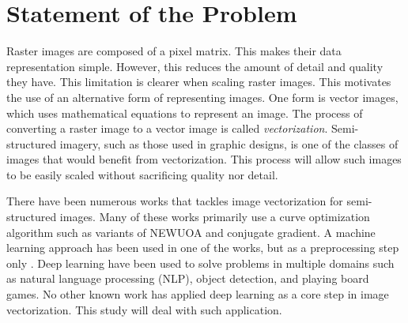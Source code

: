 \chapter{Statement of the Problem} 
\label{sec:ResearchQ}

Raster images are composed of a pixel matrix. This makes their data representation simple. However, this reduces the amount of detail and quality they have. This limitation is clearer when scaling raster images. This motivates the use of an alternative form of representing images. One form is vector images, which uses mathematical equations to represent an image. The process of converting a raster image to a vector image is called \textit{vectorization}. Semi-structured imagery, such as those used in graphic designs, is one of the classes of images that would benefit from vectorization. This process will allow such images to be easily scaled without sacrificing quality nor detail.

There have been numerous works that tackles image vectorization for semi-structured images. Many of these works primarily use a curve optimization algorithm such as variants of NEWUOA and conjugate gradient. A machine learning approach has been used in one of the works, but as a preprocessing step only \cite{hoshyari2018perceptiondriven}. Deep learning have been used to solve problems in multiple domains such as natural language processing (NLP), object detection, and playing board games. No other known work has applied deep learning as a core step in image vectorization. This study will deal with such application.


